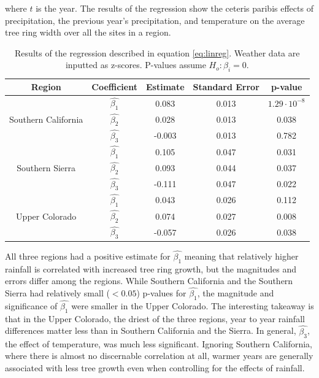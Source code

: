 \documentclass[]{article}
\begin{document}
where $t$ is the year. The results of the regression show the ceteris paribis effects of precipitation, the previous year's precipitation, and temperature on the average tree ring width over all the sites in a region.

\begin{table}
\begin{center}
\begin{tabular}{| c | c | c c c|}
\hline
Region & Coefficient & Estimate & Standard Error & p-value\\
\hline
\multirow{3}{*}{Southern California}
& $\hat{\beta_1} $&0.083&0.013& $1.29\cdot 10^{-8}$\\
& $\hat{\beta_2} $&0.028& 0.013& 0.038 \\
&$\hat{\beta_3}$& -0.003 & 0.013&0.782\\  \hline
\multirow{3}{*}{Southern Sierra}
& $\hat{\beta_1} $&0.105&0.047& 0.031 \\
& $\hat{\beta_2} $&0.093& 0.044& 0.037 \\
&$\hat{\beta_3}$& -0.111 & 0.047 &0.022\\ \hline
\multirow{3}{*}{Upper Colorado} 
& $\hat{\beta_1} $&0.043&0.026& 0.112\\
& $\hat{\beta_2} $&0.074& 0.027& 0.008 \\
&$\hat{\beta_3}$& -0.057 & 0.026&0.038\\  \hline

\end{tabular}
\end{center}
\caption{Results of the regression described in equation \ref{eq:linreg}. Weather data are inputted as z-scores. P-values assume $ H_o: \beta_i = 0$.}
\end{table}

All three regions had a positive estimate for $\hat{\beta_1}$ meaning that relatively higher rainfall is correlated with increased tree ring growth, but the magnitudes and errors differ among the regions. While Southern California and the Southern Sierra had relatively small ($<0.05$) p-values for $\hat{\beta_1}$, the magnitude and significance of $\hat{\beta_1}$  were smaller in the Upper Colorado.  The interesting takeaway is that in the Upper Colorado, the driest of the three regions, year to year rainfall differences matter less than in Southern California and the Sierra. In general,  $\hat{\beta_3}$, the effect of temperature, was much less significant. Ignoring Southern California, where there is almost no discernable correlation at all, warmer years are generally associated with less tree growth even when controlling for the effects of rainfall.
\end{document}
